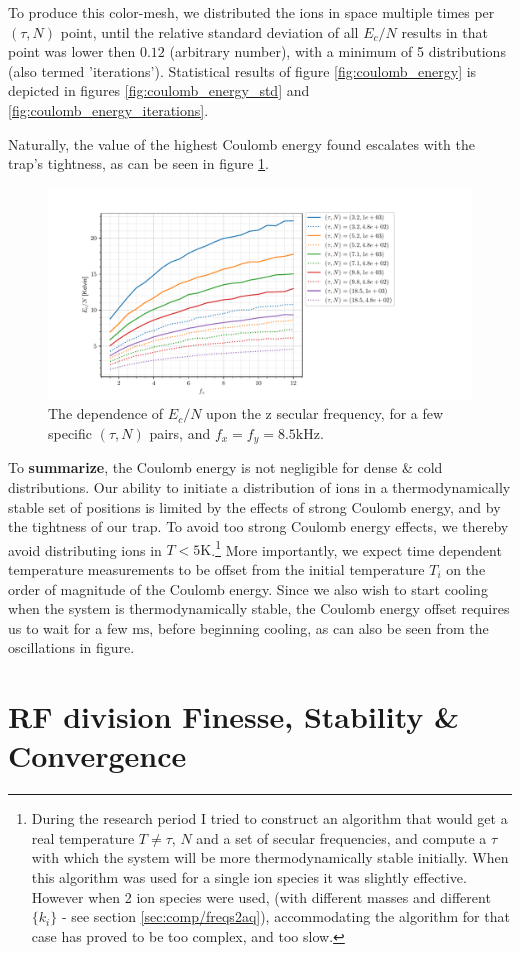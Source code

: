 To produce this color-mesh, we distributed the ions in space multiple times per $(\tau,N)$ point, until the relative standard deviation of all $E_c/N$ results in that point was lower then $0.12$ (arbitrary number), with a minimum of 5 distributions (also termed 'iterations'). Statistical results of figure \ref{fig:coulomb_energy} is depicted in figures \ref{fig:coulomb_energy_std} and \ref{fig:coulomb_energy_iterations}.

Naturally, the value of the highest Coulomb energy found escalates with the trap's tightness, as can be seen in figure \ref{fig:coulomb_energy_f_z}.

\begin{figure}
	\begin{center}
		\includegraphics[width=1.2\textwidth]{graphics/coulomb_energy_f_z.pdf}
	\end{center}
	\caption{The dependence of $E_c/N$ upon the z secular frequency, for a few specific $(\tau,N)$ pairs, and $f_x = f_y = 8.5\mathrm{kHz}$.}\label{fig:coulomb_energy_f_z}
\end{figure}

To \textbf{summarize}, the Coulomb energy is not negligible for dense \& cold distributions. Our ability to initiate a distribution of ions in a thermodynamically stable set of positions is limited by the effects of strong Coulomb energy, and by the tightness of our trap. To avoid too strong Coulomb energy effects, we thereby avoid distributing ions in $T < 5\mathrm{K}$.\footnote{During the research period I tried to construct an algorithm that would get a real temperature $T \ne \tau$, $N$ and a set of secular frequencies, and compute a $\tau$ with which the system will be more thermodynamically stable initially. When this algorithm was used for a single ion species it was slightly effective. However when 2 ion species were used, (with different masses and different $\{k_i\}$ - see section \ref{sec:comp/freqs2aq}), accommodating the algorithm for that case has proved to be too complex, and too slow.} More importantly, we expect time dependent temperature measurements to be offset from the initial temperature $T_i$ on the order of magnitude of the Coulomb energy. Since we also wish to start cooling when the system is thermodynamically stable, the Coulomb energy offset requires us to wait for a few $\mathrm{ms}$, before beginning cooling, as can also be seen from the oscillations in figure. %

\section{RF division Finesse, Stability \& Convergence}\label{sec:comp/convergence}

